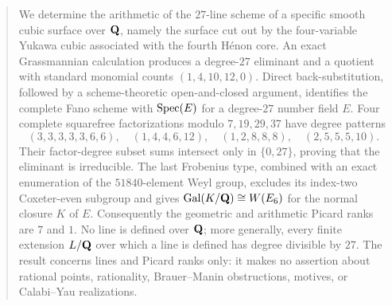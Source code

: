 \begin{abstract}
We determine the arithmetic of the \(27\)-line scheme of a specific smooth
cubic surface over \(\Q\), namely the surface cut out by the four-variable
Yukawa cubic associated with the fourth H\'enon core.  An exact Grassmannian
calculation produces a degree-\(27\) eliminant and a quotient with standard
monomial counts \((1,4,10,12,0)\).  Direct back-substitution, followed by a
scheme-theoretic open-and-closed argument, identifies the complete Fano
scheme with \(\Spec(E)\) for a degree-\(27\) number field \(E\).  Four
complete squarefree factorizations modulo \(7,19,29,37\) have degree patterns
\[
(3,3,3,3,3,6,6),\quad(1,4,4,6,12),\quad
(1,2,8,8,8),\quad(2,5,5,5,10).
\]
Their factor-degree subset sums intersect only in \(\{0,27\}\), proving that
the eliminant is irreducible.  The last Frobenius type, combined with an
exact enumeration of the \(51840\)-element Weyl group, excludes its
index-two Coxeter-even subgroup and gives
\(\Gal(K/\Q)\cong W(E_6)\) for the normal closure \(K\) of \(E\).
Consequently the geometric and arithmetic Picard ranks are \(7\) and \(1\).
No line is defined over \(\Q\); more generally, every finite extension
\(L/\Q\) over which a line is defined has degree divisible by \(27\).
The result concerns lines and Picard
ranks only: it makes no assertion about rational points, rationality,
Brauer--Manin obstructions, motives, or Calabi--Yau realizations.
\end{abstract}
